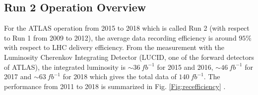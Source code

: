 \subsection{Run 2 Operation Overview}
For the ATLAS operation from 2015 to 2018 which is called Run 2 (with respect to Run 1 from 2009 to 2012), the average data recording efficiency is around $95\%$ with respect to LHC delivery efficiency. From the measurement with the Luminosity  Cherenkov  Integrating  Detector (LUCID, one of the forward detectors of ATLAS)\cite{Bruschi:2025000, ATLAS:2019pzw}, the integrated luminosity is $\sim36~fb^{-1}$ for 2015 and 2016, $\sim46~fb^{-1}$ for 2017 and $\sim63~fb^{-1}$ for 2018 which gives the total data of $140 ~fb^{-1}$. The performance from 2011 to 2018 is summarized in Fig. \ref{Fig:recefficiency}
.

